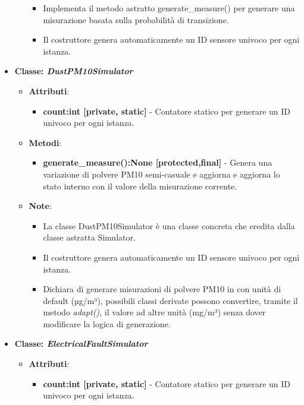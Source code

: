 \begin{itemize}
\begin{itemize}
\begin{itemize}
        \item Implementa il metodo astratto generate\_measure() per generare una misurazione basata sulla probabilità di transizione.
        \item Il costruttore genera automaticamente un ID sensore univoco per ogni istanza.
    \end{itemize}
\end{itemize}
    \item{\textbf{Classe: \textit{DustPM10Simulator}}}
    \begin{itemize}
        \item   \textbf{Attributi}: 
    \begin{itemize}
        \item \textbf{count:int [private, static]} - Contatore statico per generare un ID univoco per ogni istanza.
    \end{itemize}
    \item    \textbf{Metodi}: 
    \begin{itemize}
        \item \textbf{generate\_measure():None [protected,final]} - Genera una variazione di polvere PM10 semi-casuale e aggiorna e aggiorna lo stato interno con il valore della misurazione corrente.
    \end{itemize}
    \item    \textbf{Note}:
    \begin{itemize}
        \item La classe DustPM10Simulator è una classe concreta che eredita dalla classe astratta Simulator.
        \item Il costruttore genera automaticamente un ID sensore univoco per ogni istanza.
        \item Dichiara di generare misurazioni di polvere PM10 in con unità di default (µg/m³), possibili classi derivate possono convertire, tramite il metodo \textit{adapt()}, il valore ad altre unità (mg/m³) senza dover modificare la logica di generazione.
    \end{itemize}
\end{itemize}
    \item{\textbf{Classe: \textit{ElectricalFaultSimulator}}}
    \begin{itemize}
        \item   \textbf{Attributi}: 
    \begin{itemize}
        \item \textbf{count:int [private, static]} - Contatore statico per generare un ID univoco per ogni istanza.

\end{itemize}
\end{itemize}
\end{itemize}
